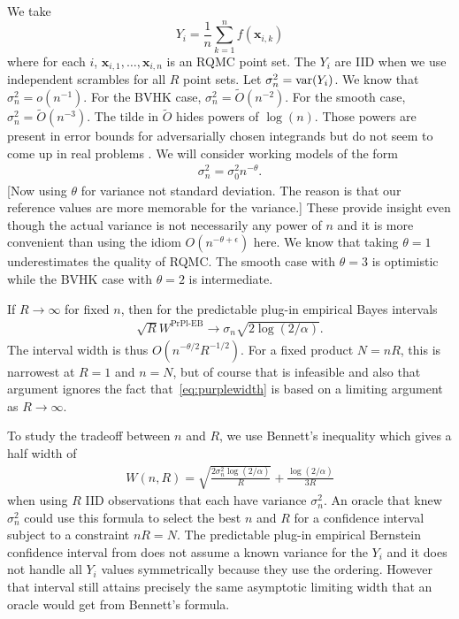 \documentclass{article}
\newcommand{\art}[1]{\begingroup\color{blue}#1\endgroup}
\newcommand{\bsx}{\boldsymbol{x}}
\newcommand{\prpleb}{\text{PrPl-EB}}
\begin{document}
We take 
$$Y_i=\frac1n\sum_{k=1}^nf(\bsx_{i,k})$$
where for each $i$, $\bsx_{i,1},\dots,\bsx_{i,n}$ is an RQMC
point set. The $Y_i$ are IID when we use independent
scrambles for all $R$ point sets. Let $\sigma^2_n = \operatorname{var}(Y_i)$.
We know that $\sigma^2_n = o(n^{-1}).$
For the BVHK case, $\sigma^2_n=\tilde O(n^{-2})$.  
For the smooth case,
$\sigma^2_n=\tilde O(n^{-3})$.  
The tilde in $\tilde O$ hides powers of $\log(n)$.
Those powers are present in error bounds for adversarially
chosen integrands but do not seem to come up in
real problems \cite{schl:2002,wherearethelogs}.
We will consider working
models of the form
\begin{align}\label{eq:themodel}
\sigma^2_n = \sigma^2_0n^{-\theta}.
\end{align}
\art{[Now using $\theta$ for variance not standard deviation.
The reason is that our reference values are more memorable
for the variance.]}
These provide insight even though the actual variance is not
necessarily any power of $n$ and it is more convenient
than using the idiom $O(n^{-\theta+\epsilon})$ here.
We know that taking $\theta=1$ underestimates
the quality of RQMC. The smooth case with $\theta = 3$ is optimistic
while the BVHK case with $\theta=2$ is intermediate.

If $R\to\infty$ for fixed $n$, then for the predictable
plug-in empirical Bayes intervals
\begin{align}\label{eq:purplewidth}
\sqrt{R}W^\prpleb\to \sigma_n\sqrt{2\log(2/\alpha)}.
\end{align}
The interval width is thus $O(n^{-\theta/2}R^{-1/2})$.
For a fixed product $N=nR$, this is narrowest at $R=1$
and $n=N$, but of course that is infeasible and also
that argument ignores the fact that~\eqref{eq:purplewidth}
is based on a limiting argument as $R\to\infty$.

To study the tradeoff between $n$ and $R$, we use Bennett's 
inequality which gives a half width of
\begin{align}\label{eq:bennettwidth}
W(n,R)=\sqrt{\frac{2\sigma_n^2\log(2/\alpha)}R}
+ \frac{\log(2/\alpha)}{3R}
\end{align}
when using $R$ IID observations that each have variance
$\sigma^2_n$. An oracle that knew $\sigma^2_n$ could
use this formula to select the best $n$ and $R$
for a confidence interval subject to a constraint $nR=N$.
The predictable plug-in empirical Bernstein confidence interval
from \cite{WauRam24a} does not assume a known variance
for the $Y_i$ and it does not handle all $Y_i$ values
symmetrically because they use the ordering.  However
that interval still attains precisely the same asymptotic limiting width
that an oracle would get from Bennett's formula. 
\end{document}
